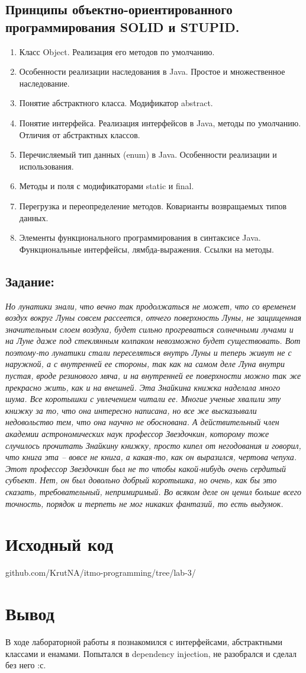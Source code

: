 \documentclass[11pt]{article}
\begin{document}
\subsection{Принципы объектно-ориентированного программирования SOLID и STUPID.}
\label{sec:orgf6bb626}
\begin{enumerate}
\item Класс Object. Реализация его методов по умолчанию.
\item Особенности реализации наследования в Java. Простое и множественное наследование.
\item Понятие абстрактного класса. Модификатор abstract.
\item Понятие интерфейса. Реализация интерфейсов в Java, методы по умолчанию. Отличия от абстрактных классов.
\item Перечисляемый тип данных (enum) в Java. Особенности реализации и использования.
\item Методы и поля с модификаторами static и final.
\item Перегрузка и переопределение методов. Коварианты возвращаемых типов данных.
\item Элементы функционального программирования в синтаксисе Java. Функциональные интерфейсы, лямбда-выражения. Ссылки на методы.
\end{enumerate}

\subsection{Задание:}
\label{sec:orgac1a380}
\emph{Но лунатики знали, что вечно так продолжаться не может, что со временем воздух вокруг Луны совсем рассеется, отчего поверхность Луны, не защищенная значительным слоем воздуха, будет сильно прогреваться солнечными лучами и на Луне даже под стеклянным колпаком невозможно будет существовать. Вот поэтому-то лунатики стали переселяться внутрь Луны и теперь живут не с наружной, а с внутренней ее стороны, так как на самом деле Луна внутри пустая, вроде резинового мяча, и на внутренней ее поверхности можно так же прекрасно жить, как и на внешней. Эта Знайкина книжка наделала много шума. Все коротышки с увлечением читали ее. Многие ученые хвалили эту книжку за то, что она интересно написана, но все же высказывали недовольство тем, что она научно не обоснована. А действительный член академии астрономических наук профессор Звездочкин, которому тоже случилось прочитать Знайкину книжку, просто кипел от негодования и говорил, что книга эта -- вовсе не книга, а какая-то, как он выразился, чертова чепуха. Этот профессор Звездочкин был не то чтобы какой-нибудь очень сердитый субъект. Нет, он был довольно добрый коротышка, но очень, как бы это сказать, требовательный, непримиримый. Во всяком деле он ценил больше всего точность, порядок и терпеть не мог никаких фантазий, то есть выдумок.}

\section{Исходный код}
\label{sec:org86cf3e8}
github.com/KrutNA/itmo-programming/tree/lab-3/

\section{Вывод}
\label{sec:org59a9f82}
В ходе лабораторной работы я познакомился с интерфейсами, абстрактными классами и енамами. Попытался в dependency injection, не разобрался и сделал без него :с.
\end{document}
